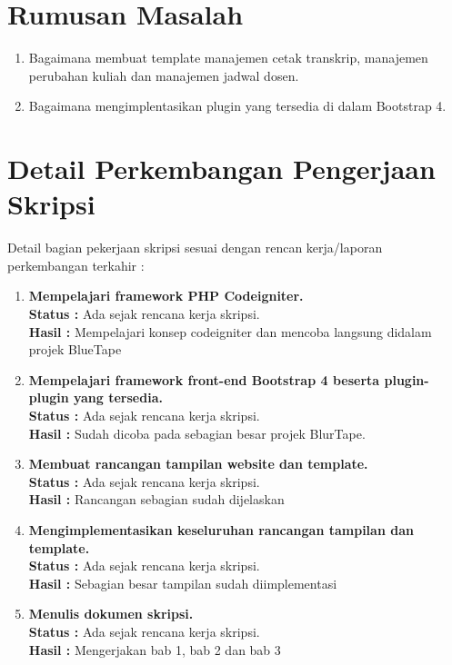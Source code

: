 \documentclass[a4paper,twoside]{article}
\begin{document}
\section{Rumusan Masalah}
\begin{enumerate}
	\item Bagaimana membuat template manajemen cetak transkrip, manajemen perubahan kuliah dan manajemen jadwal dosen.
	\item Bagaimana mengimplentasikan plugin yang tersedia di dalam Bootstrap 4.	
\end{enumerate}

\section{Detail Perkembangan Pengerjaan Skripsi}
Detail bagian pekerjaan skripsi sesuai dengan rencan kerja/laporan perkembangan terkahir :
	\begin{enumerate}
		\item \textbf{Mempelajari framework PHP Codeigniter.}\\
		{\bf Status :} Ada sejak rencana kerja skripsi.\\
		{\bf Hasil :} Mempelajari konsep codeigniter dan mencoba langsung didalam projek BlueTape
		
		\item \textbf{Mempelajari framework front-end Bootstrap 4 beserta plugin-plugin yang tersedia.}\\
		{\bf Status :} Ada sejak rencana kerja skripsi.\\
		{\bf Hasil :} Sudah dicoba pada sebagian besar projek BlurTape.

		\item \textbf{Membuat rancangan tampilan website dan template.}\\
		{\bf Status :} Ada sejak rencana kerja skripsi.\\
		{\bf Hasil :} Rancangan sebagian sudah dijelaskan

		\item \textbf{Mengimplementasikan keseluruhan rancangan tampilan dan template.}\\
		{\bf Status :} Ada sejak rencana kerja skripsi.\\
		{\bf Hasil :} Sebagian besar tampilan sudah diimplementasi

		\item \textbf{Menulis dokumen skripsi.}\\
		{\bf Status :} Ada sejak rencana kerja skripsi.\\
		{\bf Hasil :} Mengerjakan bab 1, bab 2 dan bab 3
	\end{enumerate}
\end{document}
